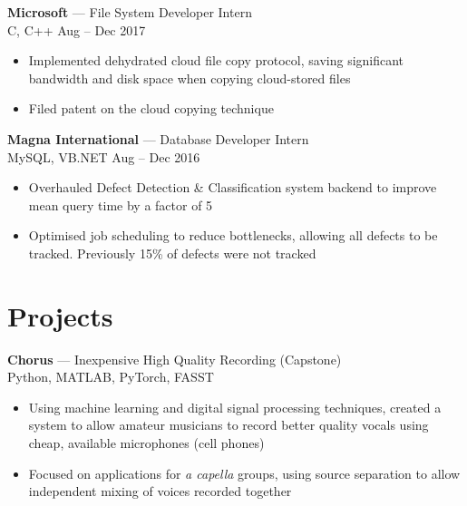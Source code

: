 \documentclass[letterpaper,10pt]{article}
\newcommand{\comment}[1]{}
\newcommand{\jobtitle}[4]{
    {\large \textbf{#1} --- #2\\}
    {\footnotesize#3 \hfill #4}
}
\begin{document}
\begin{minipage}[t]{0.6\textwidth}
\begin{itemize}
\comment{TODO: Impact statements. Quantify. Double indented list?}

\end{itemize}
\bigskip

\jobtitle{Microsoft}{File System Developer Intern}{C, C++ }{Aug -- Dec 2017}
\begin{itemize}
    \item {Implemented dehydrated cloud file copy protocol, saving significant bandwidth and disk space when copying cloud-stored files}
    \item {Filed patent on the cloud copying technique}   %
\end{itemize}
\bigskip

\jobtitle{Magna International}{Database Developer Intern}{MySQL, VB.NET}{Aug -- Dec 2016}
\begin{itemize}
    \item {Overhauled Defect Detection \& Classification system backend to improve mean query time by a factor of 5}
    \item {Optimised job scheduling to reduce bottlenecks, allowing all defects to be tracked. Previously 15\% of defects were not tracked}
\end{itemize}
\bigskip

\section{Projects}
\smallskip
{\large
\textbf{Chorus} --- Inexpensive High Quality Recording (Capstone) \\
}
{\footnotesize
Python, MATLAB, PyTorch, FASST
}
\begin{itemize}
	\item {Using machine learning and digital signal processing techniques, created a system to allow amateur musicians to record better quality vocals using cheap, available microphones (cell phones)}
    \item {Focused on applications for \textit{a capella} groups, using source separation to allow independent mixing of voices recorded together}
\end{itemize}

\bigskip

\comment{todo: MHCT?}

\comment{
{\large
\textbf{UW Autonomous Sailboat Team}\\
}
{\footnotesize
Python
}
\begin{itemize}
	\item {Implemented autonomous path planning software for round-the-buoys races on a 2 metre model sailboat}
    \item {Created automatic sail trim system in hardware}
\end{itemize}
}

\end{minipage}
\end{document}
